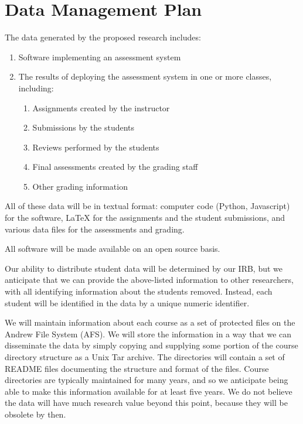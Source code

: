 \documentclass[12pt]{article}
\begin{document}
\section*{Data Management Plan}

The data generated by the proposed research includes:
\begin{enumerate}
\item Software implementing an assessment system
\item The results of deploying the assessment system in one or more
  classes, including:
\begin{enumerate}
\item
Assignments created by the instructor
\item Submissions by the students
\item Reviews performed by the students
\item Final assessments created by the grading staff
\item Other grading information
\end{enumerate}
\end{enumerate}

All of these data will be in textual format: computer code (Python,
Javascript) for the software, LaTeX for the assignments and the
student submissions, and various data files for the assessments and
grading.

All software will be made available on an open source basis.

Our ability to distribute student data will be determined by our IRB,
but we anticipate that we can provide
the above-listed information to other researchers,
with all identifying information about the students removed.
Instead, each student will be identified in the data by a unique
numeric identifier. 

We will maintain information about each course as a set of protected
files on the Andrew File System (AFS)\@.  We
will store the information in a way that we can disseminate the data
by simply copying and supplying some portion of the course directory
structure as a Unix Tar archive.  The directories will contain a set
of README files documenting the structure and format of the files.
Course directories are typically maintained for many years, and so we
anticipate being able to make this information available for at least
five years.  We do not believe the data will have much research value
beyond this point, because they will be obsolete by then.
\end{document}
